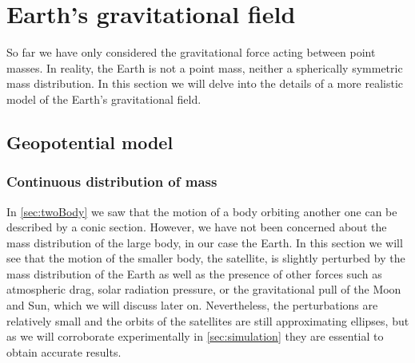 \documentclass[../main.tex]{subfiles}
\begin{document}
\section{Earth's gravitational field}\label{sec:force}
So far we have only considered the gravitational force acting between point masses. In reality, the Earth is not a point mass, neither a spherically symmetric mass distribution. In this section we will delve into the details of a more realistic model of the Earth's gravitational field.
\subsection{Geopotential model}
\subsubsection{Continuous distribution of mass}
In \cref{sec:twoBody} we saw that the motion of a body orbiting another one can be described by a conic section. However, we have not been concerned about the mass distribution of the large body, in our case the Earth. In this section we will see that the motion of the smaller body, the satellite, is slightly perturbed by the mass distribution of the Earth as well as the presence of other forces such as atmospheric drag, solar radiation pressure, or the gravitational pull of the Moon and Sun, which we will discuss later on. Nevertheless, the perturbations are relatively small and the orbits of the satellites are still approximating ellipses, but as we will corroborate experimentally in \cref{sec:simulation} they are essential to obtain accurate results.
\end{document}
